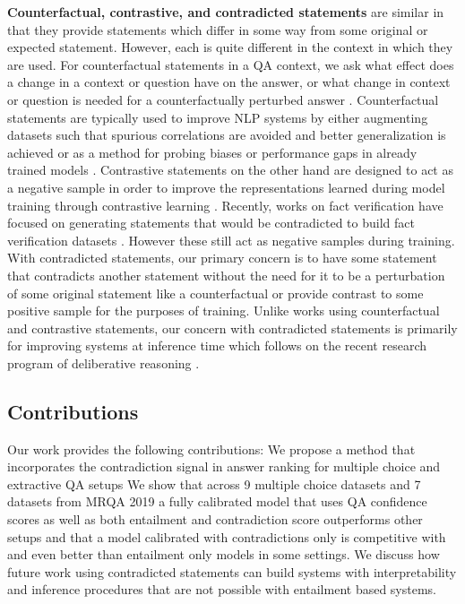 \documentclass[11pt]{article}
\begin{document}
\textbf{Counterfactual, contrastive, and contradicted statements} are similar in that they provide statements which differ in some way from some original or expected statement. However, each is quite different in the context in which they are used. For counterfactual statements in a QA context, we ask what effect does a change in a context or question have on the answer, or what change in context or question is needed for a counterfactually perturbed answer \citep{kaushik_learning_2020}. Counterfactual statements are typically used to improve NLP systems by either augmenting datasets such that spurious correlations are avoided and better generalization is achieved or as a method for probing biases or performance gaps in already trained models \citep{gardner_evaluating_2020}. Contrastive statements on the other hand are designed to act as a negative sample in order to improve the representations learned during model training through contrastive learning \citep{schuster_get_2021, cao_cliff_2021}. Recently, works on fact verification have focused on generating statements that would be contradicted to build fact verification datasets \citep{wright_generating_2022, pan_contraqa_2021, saakyan_covid-fact_2021}. However these still act as negative samples during training. With contradicted statements, our primary concern is to have some statement that contradicts another statement without the need for it to be a perturbation of some original statement like a counterfactual or provide contrast to some positive sample for the purposes of training. Unlike works using counterfactual and contrastive statements, our concern with contradicted statements is primarily for improving systems at inference time which follows on the recent research program of deliberative reasoning \citep{bostrom_flexible_2021}.
\subsection{Contributions}
Our work provides the following contributions:
We propose a method that incorporates the contradiction signal in answer ranking for multiple choice and extractive QA setups
We show that across 9 multiple choice datasets and 7 datasets from MRQA 2019 \citep{fisch_mrqa_2019} a fully calibrated model that uses QA confidence scores as well as both entailment and contradiction score outperforms other setups and that a model calibrated with contradictions only is competitive with and even better than entailment only models in some settings.
We discuss how future work using contradicted statements can build systems with interpretability and inference procedures that are not possible with entailment based systems.
\end{document}
